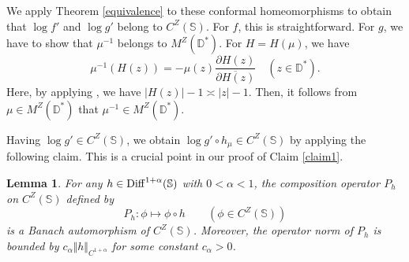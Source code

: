 \documentclass[amstex]{amsart}
\newtheorem{lemma}[theorem]{Lemma}
\theoremstyle{definition}
\theoremstyle{remark}
\numberwithin{equation}{section}
\begin{document}
We apply Theorem \ref{equivalence} to these
conformal homeomorphisms to obtain that $\log f'$ and $\log g'$ belong to $C^Z(\mathbb S)$.
For $f$, this is straightforward. For $g$, we have to show that $\mu^{-1}$ belongs to $M^Z(\mathbb D^*)$.
For $H=H(\mu)$, we have
$$
\mu^{-1}(H(z))=-\mu(z) \frac{\partial H(z)}{\overline{\partial H(z)}} \quad (z \in \mathbb D^*).
$$
Here, by applying \cite[Theorem 6.4]{M1}, we have $|H(z)|-1 \asymp |z|-1$. Then, it follows from 
$\mu \in  M^Z(\mathbb D^*)$ that $\mu^{-1} \in  M^Z(\mathbb D^*)$.

Having $\log g' \in C^Z(\mathbb S)$, we obtain $\log g'\circ h_\mu \in C^Z(\mathbb S)$ by applying the following
claim. This is a crucial point in our proof of Claim \ref{claim1}.

\begin{lemma}\label{composition}
For any $h \in {\rm Diff}^{1+\alpha}(\mathbb S)$ with $0<\alpha<1$,
the composition operator $P_h$ on $C^Z(\mathbb S)$ defined by
$$
P_h: \phi \mapsto \phi \circ h \qquad (\phi \in C^Z(\mathbb S))
$$
is a Banach automorphism of $C^Z(\mathbb S)$. Moreover, the operator norm of $P_h$ is bounded by
$c_\alpha\Vert h \Vert_{C^{1+\alpha}}$ for some constant $c_\alpha>0$.
\end{lemma}
\end{document}
